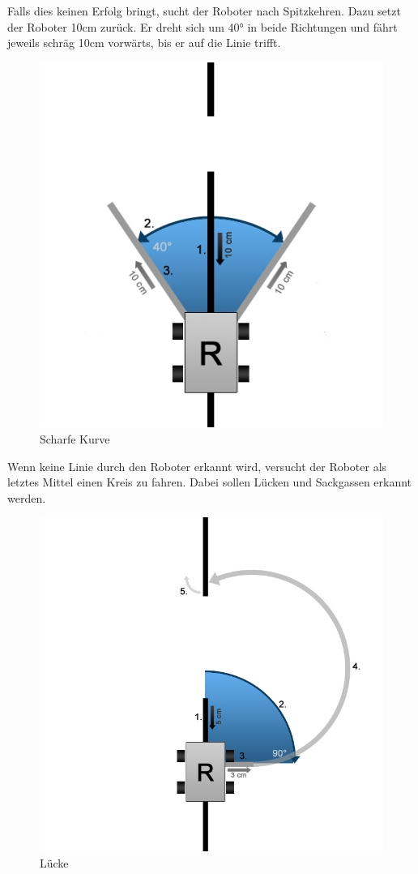 \documentclass[a4paper]{article}
\begin{document}
Falls dies keinen Erfolg bringt, sucht der Roboter nach Spitzkehren.
Dazu setzt der Roboter 10cm zurück. Er dreht sich um 40° in beide
Richtungen und fährt jeweils schräg 10cm vorwärts, bis er auf die Linie
trifft.

\begin{figure}[ht]
  \centering
  \caption{Scharfe Kurve}
  \includegraphics[scale=0.4]{scharfekurve.jpg}
\end{figure}

Wenn keine Linie durch den Roboter erkannt wird, versucht der Roboter
als letztes Mittel einen Kreis zu fahren. Dabei sollen Lücken und
Sackgassen erkannt werden.

\begin{figure}[ht]
  \centering
  \caption{Lücke}
  \includegraphics[scale=0.3]{luecke.jpg}
\end{figure}
\end{document}
